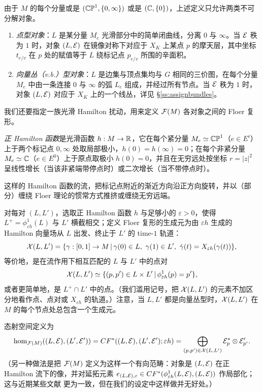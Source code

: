 由于 $M$ 的每个分量或是 $(\mathbb{CP}^1,\{0,\infty\})$ 或是 $(\mathbb{C},\{0\})$，上述定义只允许两类不可分解对象。

\begin{enumerate}
\item \emph{点型对象}：$L$ 是某分量 $M_e$ 光滑部分中的简单闭曲线，分离 $0$ 与 $\infty$。当 $\mathcal{E}$ 秩为 $1$ 时，对象 $(L,\mathcal{E})$ 在镜像对称下对应于 $X_K$ 上某点 $p$ 的摩天层，其中坐标 $t_{e/v}$ 在 $p$ 处的赋值等于 $L$ 绕标记点 $p_{e/v}$ 所围的辛面积。
\item \emph{向量丛（v.b.）型对象}：$L$ 是边集与顶点集均与 $G$ 相同的三价图，在每个分量 $M_e$ 中由一条连接 $0$ 与 $\infty$ 的弧 $L_e$ 组成，并经过所有节点。当 $\mathcal{E}$ 秩为 $1$ 时，对象 $(L,\mathcal{E})$ 对应于 $X_K$ 上的一个线丛，详见 §\ref{ss:assignbundles}。
\end{enumerate}

我们还要指定一族光滑 Hamilton 扰动，用来定义 $\mathcal{F}(M)$ 各对象之间的 Floer 复形。

\begin{defi}
\emph{正 Hamilton 函数}是光滑函数 $h:M\to\mathbb{R}$，它在每个紧分量 $M_e\simeq\mathbb{CP}^1$（$e\in E^i$）上于两个标记点 $0,\infty$ 处取局部极小，$h(0)=h(\infty)=0$；在每个非紧分量 $M_e\simeq\mathbb{C}$（$e\in E^0$）上于原点取极小 $h(0)=0$，并且在无穷远处按坐标 $r=|z|^2$ 呈线性增长（当该非紧端带停点时）或二次增长（当不带停点时）。
\end{defi}

这样的 Hamilton 函数的流，把标记点附近的渐近方向沿正方向旋转，并以（部分）缠绕 Floer 理论的惯常方式推挤或缠绕无穷远端。

对每对 $(L,L')$，选取正 Hamilton 函数 $h$ 与足够小的 $\varepsilon>0$，使得 $L^+=\phi^1_{\varepsilon h}(L)$ 与 $L'$ 横截相交；定义 Floer 复形的生成元为由 $\varepsilon h$ 生成的 Hamilton 向量场从 $L$ 出发、终止于 $L'$ 的 time-$1$ 轨道：
\begin{equation}\label{eq:floergenerators}
\cX(L,L')=\{\gamma:[0,1]\to M\,|\,\gamma(0)\in L,\ \gamma(1)\in L',\ \dot\gamma(t)=X_{\varepsilon h}(\gamma(t))\},
\end{equation}
等价地，是在流作用下相互匹配的 $L$ 与 $L'$ 中的点对
\[
\mathcal{X}(L,L')\simeq\{(p,p')\in L\times L'\,|\,\phi^1_{\varepsilon h}(p)=p'\},
\]
或者更简单地，是 $L^+\cap L'$ 中的点。（我们滥用记号，把 $\mathcal{X}(L,L')$ 的元素不加区分地看作点、点对或 $X_{\varepsilon h}$ 的轨道。）注意，当 $L,L'$ 都是向量丛型时，$\mathcal{X}(L,L')$ 在 $M$ 的每个节点处总包含一个生成元。

态射空间定义为
\begin{equation}\label{eq:morphisms}
\hom_{\mathcal{F}(M)}((L,\mathcal{E}),(L',\mathcal{E}'))=CF^*((L,\mathcal{E}),(L',\mathcal{E}');\varepsilon h)=\bigoplus_{(p,p')\in\mathcal{X}(L,L')}\mathcal{E}_p^*\otimes\mathcal{E}'_{p'}.
\end{equation}
（另一种做法是把 $\mathcal{F}(M)$ 定义为这样一个有向范畴：对象是 $(L,\mathcal{E})$ 在正 Hamilton 流下的像，并对延拓元素 $e_{(L,\mathcal{E}),\varepsilon}\in CF^*(\phi^1_{\varepsilon h}(L,\mathcal{E}),(L,\mathcal{E}))$ 作局部化；这与近期某些文献 \cite{AA,AS} 更为一致，但在我们的设定中这样做并无好处。）

